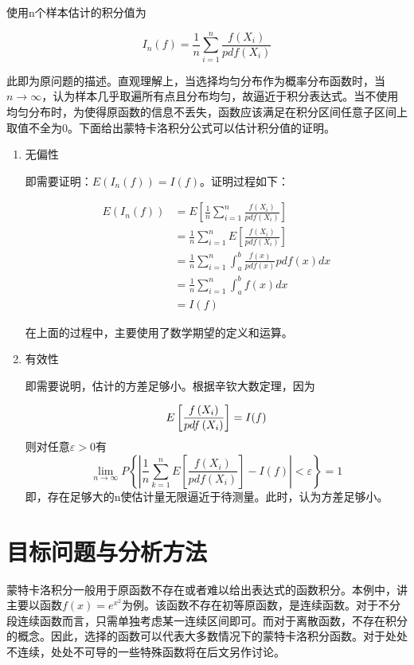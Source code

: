 \documentclass[a4paper]{IEEEtran}
\begin{document}
	使用n个样本估计的积分值为
	
	$$
	I_n(f)=\frac{1}{n} \sum_{i=1}^n \frac{f\left(X_i\right)}{p d f\left(X_i\right)}
	$$
	
	此即为原问题的描述。直观理解上，当选择均匀分布作为概率分布函数时，当$n\to \infty$，认为样本几乎取遍所有点且分布均匀，故逼近于积分表达式。当不使用均匀分布时，为使得原函数的信息不丢失，函数应该满足在积分区间任意子区间上取值不全为0。下面给出蒙特卡洛积分公式可以估计积分值的证明。
	
	\begin{enumerate}
		\item 无偏性
		
		即需要证明：$E(I_n(f))=I(f)$。证明过程如下：
	
	$$	
		\begin{aligned}
			E(I_n(f)) & =E\left[\frac{1}{n} \sum_{i=1}^{n} \frac{f\left(X_i\right)}{p d f (X_i)}\right] \\
			& =\frac{1}{n} \sum_{i=1}^{n} E\left[\frac{f\left(X_i\right)}{p d f\left(X_i\right)}\right] \\
			& =\frac{1}{n} \sum_{i=1}^{n} \int_a^b \frac{f(x)}{p d f(x)} p d f(x) d x \\
			& =\frac{1}{n} \sum_{i=1}^{n} \int_a^b f(x) d x \\
			& =I(f)
		\end{aligned}
	$$
	
	在上面的过程中，主要使用了数学期望的定义和运算。
	
	\item 有效性
	
	即需要说明，估计的方差足够小。根据辛钦大数定理，因为
	
	$$
	E\left[\frac{f\left(X_i\right)}{p d f\left(X_i\right)}\right] = I(f) \\
	$$
	则对任意$\varepsilon>0$有
	$$
	{\lim _{n \rightarrow \infty} P\left\{\left|\frac{1}{n} \sum_{k=1}^n E\left[\frac{f\left(X_i\right)}{p d f\left(X_i\right)}\right]-I(f)\right|<\varepsilon\right\}=1}
	$$
	即，存在足够大的n使估计量无限逼近于待测量。此时，认为方差足够小。
	\end{enumerate}

	\section{目标问题与分析方法}
	蒙特卡洛积分一般用于原函数不存在或者难以给出表达式的函数积分。本例中，讲主要以函数$f(x)=e^{x^2}$为例。该函数不存在初等原函数，是连续函数。对于不分段连续函数而言，只需单独考虑某一连续区间即可。而对于离散函数，不存在积分的概念。因此，选择的函数可以代表大多数情况下的蒙特卡洛积分函数。对于处处不连续，处处不可导的一些特殊函数将在后文另作讨论。
	
\end{document}

